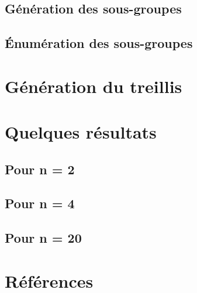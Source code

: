 \documentclass[11pt]{article}
\begin{document}
\subsection{Génération des sous-groupes}
\subsection{Énumération des sous-groupes}

\section{Génération du treillis}

\section {Quelques résultats}
\subsection{Pour n = 2}
\subsection{Pour n = 4}
\subsection{Pour n = 20}


\section{Références}
\end{document}

